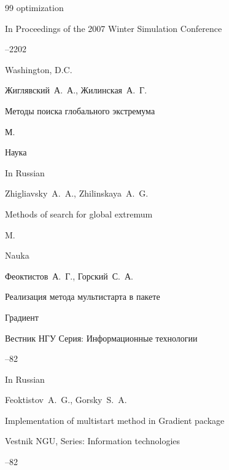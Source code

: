 \begin{thebibliography}{99}
optimization

\inbook In Proceedings of the 2007 Winter Simulation Conference

--2202

\publaddr Washington, D.C.





\by  Жиглявский~А.~А., Жилинская~А.~Г.

\book Методы поиска глобального экстремума

\publaddr М.

\publ Наука



\misctransl

\lang In Russian

\by Zhigliavsky~A.~A., Zhilinskaya~A.~G.

\book Methods of search for global extremum

\publaddr M.

\publ Nauka






\by Феоктистов~А.~Г., Горский~С.~А.

\paper  Реализация метода мультистарта в пакете

Градиент

\jour Вестник НГУ Серия: Информационные технологии




--82

\misctransl

\lang In Russian

\by Feoktistov~A.~G., Gorsky~S.~A.

\paper Implementation of multistart method in Gradient package

\jour Vestnik NGU, Series: Information technologies




--82






\end{thebibliography}
